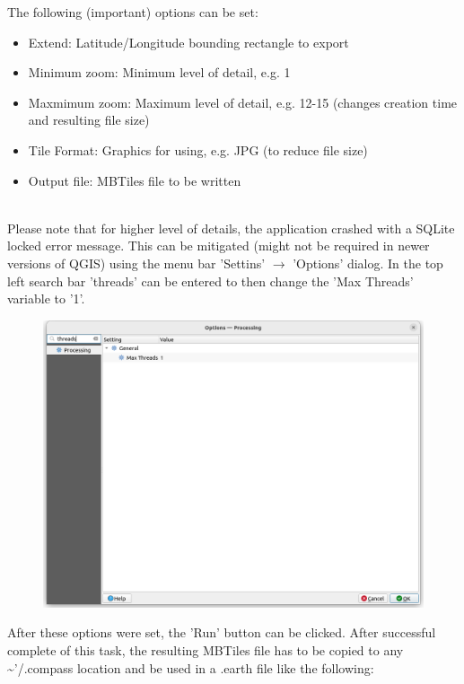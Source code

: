 The following (important) options can be set:
\begin{itemize}
 \item Extend: Latitude/Longitude bounding rectangle to export
 \item Minimum zoom: Minimum level of detail, e.g. 1
 \item Maxmimum zoom: Maximum level of detail, e.g. 12-15 (changes creation time and resulting file size)
 \item Tile Format: Graphics for using, e.g. JPG (to reduce file size)
 \item Output file: MBTiles file to be written
\end{itemize}
 \ \\

Please note that for higher level of details, the application crashed with a SQLite locked error message. This can be mitigated (might not be required in newer versions of QGIS) using the menu bar 'Settins' $\rightarrow$ 'Options' dialog. In the top left search bar 'threads' can be entered to then change the 'Max Threads' variable to '1'. \\

\begin{figure}[H]
    \includegraphics[width=14cm,frame]{figures/qgis_osm4.png}
\end{figure}
 
After these options were set, the 'Run' button can be clicked. After successful complete of this task, the resulting MBTiles file has to be copied to any \textasciitilde'/.compass location and be used in a .earth file like the following:

